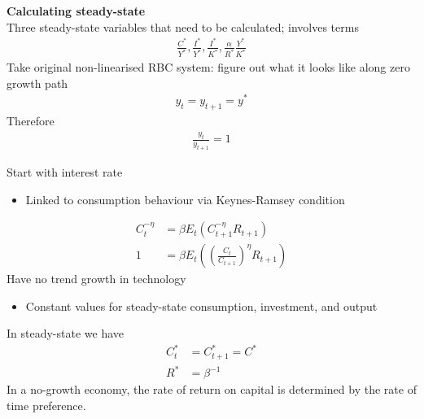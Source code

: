 \documentclass{beamer}
\begin{document}
\begin{frame}
  \textbf{Calculating steady-state}\\
  Three steady-state variables that need to be calculated; involves terms
  \begin{align}
    \frac{C^*}{Y^*},\frac{I^*}{Y^*},\frac{I^*}{K^*},\frac{\alpha}{R^*}\frac{Y^*}{K^*}
  \end{align}
  \medskip
  Take original non-linearised RBC system: figure out what it looks like along zero growth path
  \begin{align}
    y_t=y_{t+1}=y^*
  \end{align}
  Therefore
  \begin{align}
    \frac{y_t}{y_{t+1}}=1
  \end{align}
\end{frame}

\begin{frame}
 Start with interest rate
 \begin{itemize}
   \item Linked to consumption behaviour via Keynes-Ramsey condition
 \end{itemize}
  \begin{align}
  C_t^{-\eta} &= \beta E_t(C_{t+1}^{-\eta}R_{t+1})\\
  1 &= \beta E_t \left( \left(\frac{C_t}{C_{t+1}} \right)^\eta R_{t+1} \right)
\end{align}
  Have no trend growth in technology
  \begin{itemize}
    \item Constant values for steady-state consumption, investment, and output
  \end{itemize}
  In steady-state we have
  \begin{align}
  C^*_t &= C^*_{t+1}=C^*\\
  R^* &= \beta^{-1}
\end{align}
\medskip
In a no-growth economy, the rate of return on capital is determined by the rate of time preference.
\end{frame}
\end{document}
